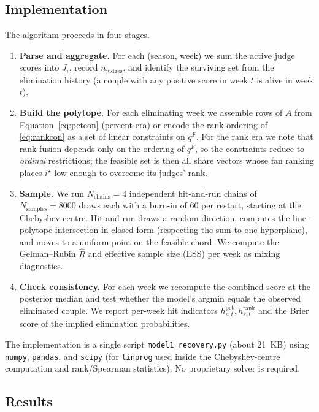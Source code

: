 \documentclass{article}
\begin{document}
\subsection{Implementation}

The algorithm proceeds in four stages.

\begin{enumerate}
\item \textbf{Parse and aggregate.} For each (season, week) we sum the active judge scores
into $J_i$, record $n_{\text{judges}}$, and identify the surviving set from the
elimination history (a couple with any positive score in week $t$ is alive in week $t$).
\item \textbf{Build the polytope.} For each eliminating week we assemble rows of $A$
from Equation~\eqref{eq:pctcon} (percent era) or encode the rank ordering of
\eqref{eq:rankcon} as a set of linear constraints on $q^{F}$. For the rank era we note
that rank fusion depends only on the ordering of $q^{F}$, so the constraints reduce to
\emph{ordinal} restrictions; the feasible set is then all share vectors whose fan ranking
places $i^{\star}$ low enough to overcome its judges' rank.
\item \textbf{Sample.} We run $N_{\text{chains}}=4$ independent hit-and-run chains of
$N_{\text{samples}}=8000$ draws each with a burn-in of $60$ per restart, starting at the
Chebyshev centre. Hit-and-run draws a random direction, computes the line--polytope
intersection in closed form (respecting the sum-to-one hyperplane), and moves to a uniform
point on the feasible chord. We compute the Gelman--Rubin $\hat R$ and effective sample
size (ESS) per week as mixing diagnostics.
\item \textbf{Check consistency.} For each week we recompute the combined score at the
posterior median and test whether the model's argmin equals the observed eliminated couple.
We report per-week hit indicators $h^{\text{pct}}_{s,t}, h^{\text{rank}}_{s,t}$ and the
Brier score of the implied elimination probabilities.
\end{enumerate}

The implementation is a single script \texttt{model1\_recovery.py} (about 21~KB) using
\texttt{numpy}, \texttt{pandas}, and \texttt{scipy} (for \texttt{linprog} used inside the
Chebyshev-centre computation and rank/Spearman statistics). No proprietary solver is
required.

\subsection{Results}
\end{document}
